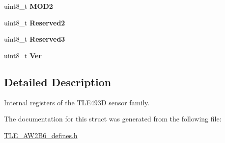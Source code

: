 \begin{DoxyCompactItemize}
\mbox{\label{struct_t_l_e493_d__regmap__t_aafff15a7262bcb471284ceb991b2f73a}} 
uint8\+\_\+t {\bfseries M\+O\+D2}
\item 
\mbox{\label{struct_t_l_e493_d__regmap__t_ac032c6c44c9f05e7cc7f7cf3c935f676}} 
uint8\+\_\+t {\bfseries Reserved2}
\item 
\mbox{\label{struct_t_l_e493_d__regmap__t_a0939cd02569e10bcccc5b3b4f72482ba}} 
uint8\+\_\+t {\bfseries Reserved3}
\item 
\mbox{\label{struct_t_l_e493_d__regmap__t_a2af1974c64f1440e8b7c10befed2da93}} 
uint8\+\_\+t {\bfseries Ver}
\end{DoxyCompactItemize}


\subsection{Detailed Description}
Internal registers of the T\+L\+E493D sensor family. 

The documentation for this struct was generated from the following file\+:\begin{DoxyCompactItemize}
\item 
\mbox{\hyperlink{_t_l_e___a_w2_b6__defines_8h}{T\+L\+E\+\_\+\+A\+W2\+B6\+\_\+defines.\+h}}\end{DoxyCompactItemize}
